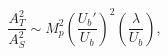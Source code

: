 \begin{equation}
\frac{A_T^2}{A_S^2} \sim M_p^2 \left(\frac{U_b'}{U_b} \right)^2
\left(\frac{\lambda}{U_b} \right),
\end{equation}

